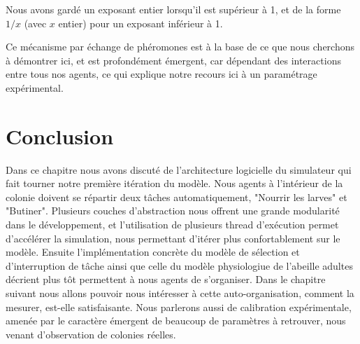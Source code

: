 	Nous avons gardé un exposant entier lorsqu'il est supérieur à 1, et de la forme $1/x$ (avec $x$ entier) pour un exposant inférieur à 1.
	
	
	Ce mécanisme par échange de phéromones est à la base de ce que nous cherchons à démontrer ici, et est profondément émergent, car dépendant des interactions entre tous nos agents, ce qui explique notre recours ici à un paramétrage expérimental.
			
	\section*{Conclusion}
		Dans ce chapitre nous avons discuté de l'architecture logicielle du simulateur qui fait tourner notre première itération du modèle. Nous agents à l'intérieur de la colonie doivent se répartir deux tâches automatiquement, "Nourrir les larves" et "Butiner". Plusieurs couches d'abstraction nous offrent une grande modularité dans le développement, et l'utilisation de plusieurs thread d'exécution permet d'accélérer la simulation, nous permettant d'itérer plus confortablement sur le modèle. Ensuite l'implémentation concrète du modèle de sélection et d'interruption de tâche ainsi que celle du modèle physiologiue de l'abeille adultes décrient plus tôt permettent à nous agents de s'organiser. Dans le chapitre suivant nous allons pouvoir nous intéresser à cette auto-organisation, comment la mesurer, est-elle satisfaisante. Nous parlerons aussi de calibration expérimentale, amenée par le caractère émergent de beaucoup de paramètres à retrouver, nous venant d'observation de colonies réelles.
	